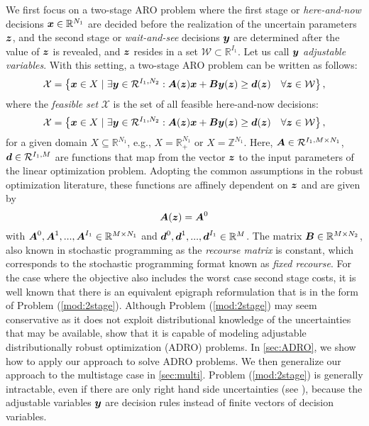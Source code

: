 \documentclass[fleqn,orsc,blindrev]{informs4}
\newcommand{\mb}[1]{\mbox{\boldmath \ensuremath{#1}}}
\renewcommand{\Re}{\mathbb{R}}
\begin{document}
We first focus on a two-stage ARO problem where the first stage or {\em here-and-now} decisions  $\mb{x} \in \Re^{N_1}$ are decided before the realization of the uncertain parameters $\mb{z}$,  {and} the second stage or {\em wait-and-see} decisions $\mb{y}$ are determined after the value of $\mb{z}$ is revealed, and $\mb{z}$ resides in a set $\mathcal{W} \subset \mathbb{R}^{I_1}$. Let us call $\mb{y}$ {\em adjustable variables}. With this setting, a two-stage ARO problem can be written as follows:
\begin{equation}
\label{mod:2stage}
\mathcal{X} = \left\{ \mb{x} \in X \hspace{3pt} | \hspace{3pt}  \exists \mb{y} \in \mathcal{R}^{I_1,N_2}: \mb{A}(\mb{z})\mb{x}+\mb{B}\mb{y}(\mb{z}) \geq\mb{d}(\mb{z})  \quad  \forall \mb{z} \in \mathcal{W} \right\},
\end{equation}
where the {\em feasible set} $\mathcal{X}$ is the set of all feasible here-and-now decisions:
\begin{equation}\label{set:X}
\mathcal{X} = \left\{ \mb{x} \in X \hspace{3pt} | \hspace{3pt}  \exists \mb{y} \in \mathcal{R}^{I_1,N_2}: \mb{A}(\mb{z})\mb{x}+\mb{B}\mb{y}(\mb{z}) \geq\mb{d}(\mb{z})  \quad  \forall \mb{z} \in \mathcal{W} \right\},
\end{equation}
for a given domain $X\subseteq \mathbb{R}^{N_1}$, e.g., $X= \mathbb{R}^{N_1}_+$  {or $X= \mathbb{Z}^{N_1}$}. Here,  $\mb{A} \in \mathcal{R}^{I_1,M \times N_1}$,  $\mb{d} \in \mathcal{R}^{I_1,M}$ are functions that map from the vector $\mb{z}$ to the input parameters of the linear optimization problem. Adopting the common assumptions in the robust optimization literature, these functions are affinely dependent on $\mb{z}$ and are given by
\begin{equation*}
\mb{A}(\mb{z}) = \mb{A}^0%
\end{equation*}
	with $\mb{A}^0, \mb{A}^1,..., \mb{A}^{I_1} \in \Re^{M \times N_1}$ and $\mb{d}^0, \mb{d}^1,..., \mb{d}^{I_1} \in \Re^{M}$. The matrix $\mb{B} \in \Re^{M \times N_2}$, also known in stochastic programming as the {\em recourse matrix} is constant, which corresponds to the stochastic programming format known as {\em fixed recourse}. For the case where the objective also includes the worst case second stage costs, it is well known that there is an equivalent epigraph reformulation that is in the form of Problem (\ref{mod:2stage}). Although Problem (\ref{mod:2stage}) may seem conservative as it does not exploit distributional knowledge of the uncertainties that may be available, \cite{bsz17} show that it is capable of modeling adjustable distributionally robust optimization (ADRO) problems. In \textsection \ref{sec:ADRO}, we show how to apply our approach to solve ADRO problems.  {We then generalize our approach to the multistage case in \textsection \ref{sec:multi}.} Problem (\ref{mod:2stage}) is generally intractable, even if there are only right hand side uncertainties (see \cite{m11}), because the adjustable variables $\mb{y}$ are decision rules instead of finite vectors of decision variables.
	
\end{document}
